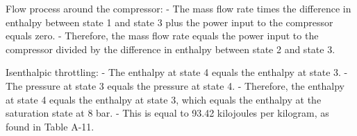 Flow process around the compressor:
- The mass flow rate times the difference in enthalpy between state 1 and state 3 plus the power input to the compressor equals zero.
- Therefore, the mass flow rate equals the power input to the compressor divided by the difference in enthalpy between state 2 and state 3.

Isenthalpic throttling:
- The enthalpy at state 4 equals the enthalpy at state 3.
- The pressure at state 3 equals the pressure at state 4.
- Therefore, the enthalpy at state 4 equals the enthalpy at state 3, which equals the enthalpy at the saturation state at 8 bar.
- This is equal to 93.42 kilojoules per kilogram, as found in Table A-11.